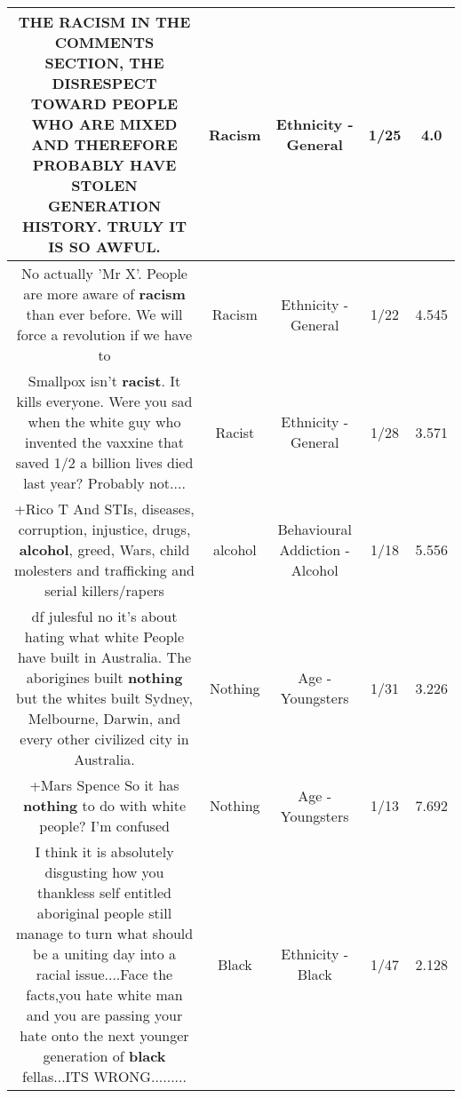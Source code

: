 \documentclass[11pt]{article}
\newlength\mylength
\begin{document}
\begin{center}
\begin{longtable}{|C{.65\mylength}|C{.30\mylength}|C{.12\mylength}|C{.12\mylength}|C{.12\mylength}|}
  \small THE \textbf{RACISM} IN THE COMMENTS SECTION, THE DISRESPECT TOWARD PEOPLE  WHO ARE MIXED AND THEREFORE PROBABLY HAVE STOLEN GENERATION HISTORY. TRULY IT IS SO AWFUL.\normalsize   & Racism & Ethnicity - General & 1/25 & 4.0 \\  \hline
  \small No actually 'Mr X'. People are more aware of \textbf{racism} than ever before. We will force a revolution if we have to\normalsize   & Racism & Ethnicity - General & 1/22 & 4.545 \\  \hline
  \small Smallpox isn't \textbf{racist}.  It kills everyone.  Were you sad when the white guy who invented the vaxxine that saved 1/2 a billion lives died last year?  Probably not....\normalsize   & Racist & Ethnicity - General & 1/28 & 3.571 \\  \hline
  \small +Rico T And STIs, diseases, corruption, injustice, drugs, \textbf{alcohol}, greed, Wars,  child molesters and trafficking and serial killers/rapers\normalsize   & alcohol & Behavioural Addiction - Alcohol & 1/18 & 5.556 \\  \hline
  \small df julesful no it's about hating what white People have built in Australia. The aborigines built \textbf{nothing} but the whites built Sydney, Melbourne, Darwin, and every other civilized city in Australia.\normalsize   & Nothing & Age - Youngsters & 1/31 & 3.226 \\  \hline
  \small +Mars Spence So it has \textbf{nothing} to do with white people? I'm confused\normalsize   & Nothing & Age - Youngsters & 1/13 & 7.692 \\  \hline
  \small I think it is absolutely disgusting how you thankless self entitled aboriginal people still manage to turn what should be a uniting day into a racial issue....Face the facts,you hate white man and you are passing your hate onto the next younger generation of \textbf{black} fellas...ITS WRONG.........\normalsize   & Black & Ethnicity - Black & 1/47 & 2.128 \\  \hline

\end{longtable}
\end{center}
\end{document}
